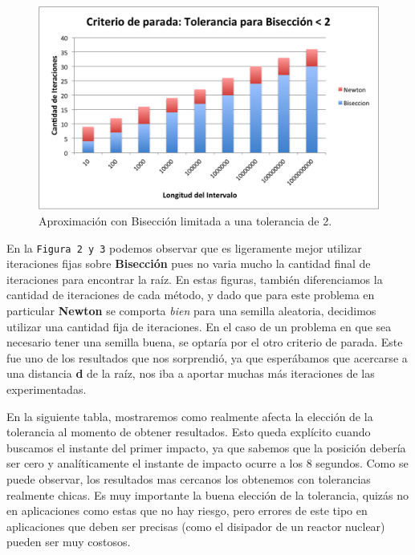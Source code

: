 \documentclass[a4paper]{article}
\begin{document}
\begin{figure}[H]
  \centering
  \includegraphics[scale=0.80]{graficos/3-BiseccionXTolerancia.png}
  \caption{Aproximación con Bisección limitada a una tolerancia de 2. }
\end{figure}

En la \texttt{Figura 2 y 3} podemos observar que es ligeramente mejor utilizar iteraciones fijas sobre \textbf{Bisección} pues no varia mucho la cantidad final de iteraciones para encontrar la raíz. En estas figuras, también diferenciamos la cantidad de iteraciones de cada método, y dado que para este problema en particular \textbf{Newton} se comporta \textit{bien} para una semilla aleatoria, decidimos utilizar una cantidad fija de iteraciones.
En el caso de un problema en que sea necesario tener una semilla buena, se optaría por el otro criterio de parada.
Este fue uno de los resultados que nos sorprendió, ya que esperábamos que acercarse a una distancia \textbf{d} de la raíz, nos iba a aportar muchas más iteraciones de las experimentadas.

\newpage

En la siguiente tabla, mostraremos como realmente afecta la elección de la tolerancia al momento de obtener resultados. Esto queda explícito cuando buscamos el instante del primer impacto, ya que sabemos que la posición debería ser cero y analíticamente el instante de impacto ocurre a los 8 segundos. Como se puede observar, los resultados mas cercanos los obtenemos con tolerancias realmente chicas.
Es muy importante la buena elección de la tolerancia, quizás no en aplicaciones como estas que no hay riesgo, pero errores de este tipo en aplicaciones que deben ser precisas (como el disipador de un reactor nuclear) pueden ser muy costosos.
\end{document}
